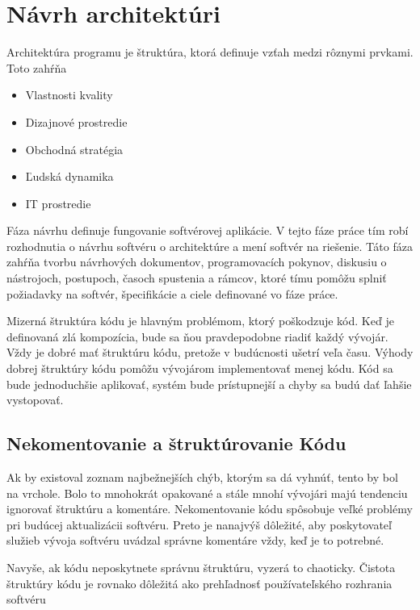\documentclass[10pt,twoside,slovak,a4paper]{article}
\begin{document}
\section{Návrh architektúri}
Architektúra programu je štruktúra, ktorá definuje vzťah medzi rôznymi prvkami. Toto zahŕňa

\begin{itemize}
\item Vlastnosti kvality
\item Dizajnové prostredie
\item Obchodná stratégia
\item Ľudská dynamika
\item IT prostredie
\end{itemize}

Fáza návrhu definuje fungovanie softvérovej aplikácie. V tejto fáze práce tím robí rozhodnutia o návrhu softvéru o architektúre a mení softvér na riešenie. Táto fáza zahŕňa tvorbu návrhových dokumentov, programovacích pokynov, diskusiu o nástrojoch, postupoch, časoch spustenia a rámcov, ktoré tímu pomôžu splniť požiadavky na softvér, špecifikácie a ciele definované vo fáze práce.\cite{VyvojProces3}




Mizerná štruktúra kódu je hlavným problémom, ktorý poškodzuje kód. Keď je definovaná zlá kompozícia, bude sa ňou pravdepodobne riadiť každý vývojár. Vždy je dobré mať štruktúru kódu, pretože v budúcnosti ušetrí veľa času. Výhody dobrej štruktúry kódu pomôžu vývojárom implementovať menej kódu. Kód sa bude jednoduchšie aplikovať, systém bude prístupnejší a chyby sa budú dať ľahšie vystopovať.

\subsection{Nekomentovanie a štruktúrovanie Kódu}

Ak by existoval zoznam najbežnejších chýb, ktorým sa dá vyhnúť, tento by bol na vrchole. Bolo to mnohokrát opakované a stále mnohí vývojári majú tendenciu ignorovať štruktúru a komentáre. Nekomentovanie kódu spôsobuje veľké problémy pri budúcej aktualizácii softvéru. Preto je nanajvýš dôležité, aby poskytovateľ služieb vývoja softvéru uvádzal správne komentáre vždy, keď je to potrebné.

Navyše, ak kódu neposkytnete správnu štruktúru, vyzerá to chaoticky. Čistota štruktúry kódu je rovnako dôležitá ako prehľadnosť používateľského rozhrania softvéru
\end{document}

